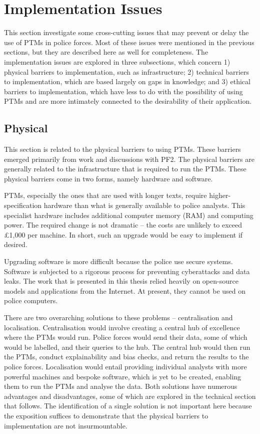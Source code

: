 \section{Implementation Issues} This section investigate some cross-cutting issues that may prevent or delay the use of PTMs in police forces. Most of these issues were mentioned in the previous sections, but they are described here as well for completeness. The implementation issues are explored in three subsections, which concern 1) physical barriers to implementation, such as infrastructure; 2) technical barriers to implementation, which are based largely on gaps in knowledge; and 3) ethical barriers to implementation, which have less to do with the possibility of using PTMs and are more intimately connected to the desirability of their application. 

\subsection{Physical} This section is related to the physical barriers to using PTMs. These barriers emerged primarily from work and discussions with PF2. The physical barriers are generally related to the infrastructure that is required to run the PTMs. These physical barriers come in two forms, namely hardware and software.

PTMs, especially the ones that are used with longer texts, require higher-specification hardware than what is generally available to police analysts. This specialist hardware includes additional computer memory (RAM) and computing power. The required change is not dramatic – the costs are unlikely to exceed £1,000 per machine. In short, such an upgrade would be easy to implement if desired.

Upgrading software is more difficult because the police use secure systems. Software is subjected to a rigorous process for preventing cyberattacks and data leaks. The work that is presented in this thesis relied heavily on open-source models and applications from the Internet. At present, they cannot be used on police computers.

There are two overarching solutions to these problems – centralisation and localisation. Centralisation would involve creating a central hub of excellence where the PTMs would run. Police forces would send their data, some of which would be labelled, and their queries to the hub. The central hub would then run the PTMs, conduct explainability and bias checks, and return the results to the police forces. Localisation would entail providing individual analysts with more powerful machines and bespoke software, which is yet to be created, enabling them to run the PTMs and analyse the data. Both solutions have numerous advantages and disadvantages, some of which are explored in the technical section that follows. The identification of a single solution is not important here because the exposition suffices to demonstrate that the physical barriers to implementation are not insurmountable. 
    

